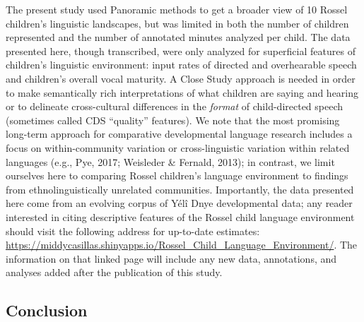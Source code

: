 \documentclass[,man,floatsintext]{apa6}
\begin{document}
The present study used Panoramic methods to get a broader view of 10
Rossel children's linguistic landscapes, but was limited in both the
number of children represented and the number of annotated minutes
analyzed per child. The data presented here, though transcribed, were
only analyzed for superficial features of children's linguistic
environment: input rates of directed and overhearable speech and
children's overall vocal maturity. A Close Study approach is needed in
order to make semantically rich interpretations of what children are
saying and hearing or to delineate cross-cultural differences in the
\emph{format} of child-directed speech (sometimes called CDS
\enquote{quality} features). We note that the most promising long-term
approach for comparative developmental language research includes a
focus on within-community variation or cross-linguistic variation within
related languages (e.g., Pye, 2017; Weisleder \& Fernald, 2013); in
contrast, we limit ourselves here to comparing Rossel children's
language environment to findings from ethnolinguistically unrelated
communities. Importantly, the data presented here come from an evolving
corpus of Yélî Dnye developmental data; any reader interested in citing
descriptive features of the Rossel child language environment should
visit the following address for up-to-date estimates:
\url{https://middycasillas.shinyapps.io/Rossel_Child_Language_Environment/}.
The information on that linked page will include any new data,
annotations, and analyses added after the publication of this study.

\subsection{Conclusion}\label{disc-conclusion}
\end{document}
